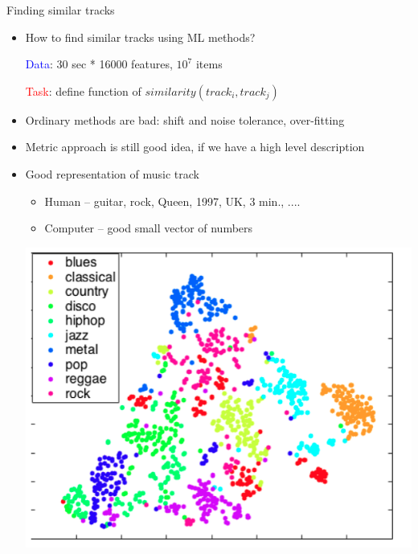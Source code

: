 \documentclass{beamer}
\begin{document}
\begin{frame}{Finding similar tracks}
	\begin{itemize}
		\item How to find similar tracks using ML methods?
			\begin{center}		  
				 \textcolor{blue}{Data}: 30 sec * 16000 features, $10^7$ items
				
				 \textcolor{red}{Task}: define function of $similarity(track_i, track_j)$
			\end{center}
		
		 \item  Ordinary methods are bad: shift and noise tolerance, over-fitting 
		\item Metric approach is still good idea, if we have a high level description
		\item Good representation of music track
		\begin{itemize}
			\item Human -- guitar, rock, Queen, 1997, UK, 3 min., .... 
			\item Computer -- good small vector of numbers  
		\end{itemize}
		
			\begin{center}
				\includegraphics[scale=0.25]{img/geners}
			\end{center}
		
	\end{itemize}
\end{frame}
\end{document}
